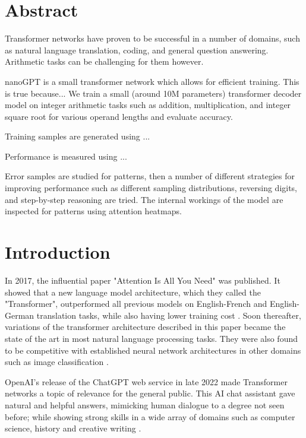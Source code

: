 \thispagestyle{empty}
\section*{Abstract}

Transformer networks have proven to be successful in a number of domains, such as natural language translation, coding, and general question answering. Arithmetic tasks can be challenging for them however.

nanoGPT is a small transformer network which allows for efficient training. This is true because...
We train a small (around 10M parameters) transformer decoder model on integer arithmetic tasks such as addition, multiplication, and integer square root for various operand lengths and evaluate accuracy.

Training samples are generated using ...

Performance is measured using ...

Error samples are studied for patterns, then a number of different strategies for improving performance such as different sampling distributions, reversing digits, and step-by-step reasoning are tried. The internal workings of the model are inspected for patterns using attention heatmaps.

\clearpage

\tableofcontents
\clearpage

\section{Introduction}

In 2017, the influential paper "Attention Is All You Need" \cite{allyouneed} was published. It showed that a new language model architecture, which they called the "Transformer", outperformed all previous models on English-French and English-German translation tasks, while also having lower training cost . Soon thereafter, variations of the transformer architecture described in this paper became the state of the art in most natural language processing tasks. They were also found to be competitive with established neural network architectures in other domains such as image classification .

OpenAI's release of the ChatGPT web service in late 2022 \cite{openai_chatgpt_2022} made Transformer networks a topic of relevance for the general public. This AI chat assistant gave natural and helpful answers, mimicking human dialogue to a degree not seen before; while showing strong skills in a wide array of domains such as computer science, history and creative writing \cite{Savelka_2023} .

